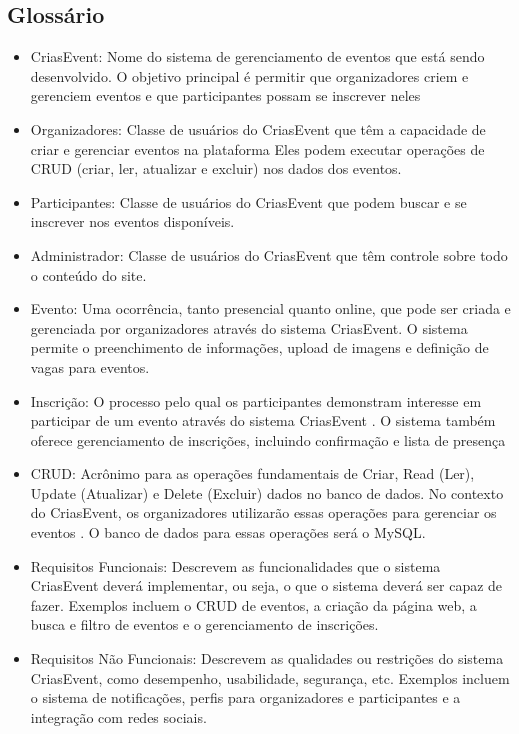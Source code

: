 \begin{appendices}
\chapter{Glossário}
\begin{itemize}
 \item CriasEvent: Nome do sistema de gerenciamento de eventos que está sendo desenvolvido. O objetivo principal é permitir que organizadores criem e gerenciem eventos e que participantes possam se inscrever neles

\item Organizadores: Classe de usuários do CriasEvent que têm a capacidade de criar e gerenciar eventos na plataforma Eles podem executar operações de CRUD (criar, ler, atualizar e excluir) nos dados dos eventos.

\item Participantes: Classe de usuários do CriasEvent que podem buscar e se inscrever nos eventos disponíveis.

\item Administrador: Classe de usuários do CriasEvent que têm controle sobre todo o conteúdo do site.

\item Evento: Uma ocorrência, tanto presencial quanto online, que pode ser criada e gerenciada por organizadores através do sistema CriasEvent. O sistema permite o preenchimento de informações, upload de imagens e definição de vagas para eventos.

\item Inscrição: O processo pelo qual os participantes demonstram interesse em participar de um evento através do sistema CriasEvent . O sistema também oferece gerenciamento de inscrições, incluindo confirmação e lista de presença 

\item CRUD: Acrônimo para as operações fundamentais de Criar, Read (Ler), Update (Atualizar) e Delete (Excluir) dados no banco de dados. No contexto do CriasEvent, os organizadores utilizarão essas operações para gerenciar os eventos . O banco de dados para essas operações será o MySQL.

\item Requisitos Funcionais: Descrevem as funcionalidades que o sistema CriasEvent deverá implementar, ou seja, o que o sistema deverá ser capaz de fazer. Exemplos incluem o CRUD de eventos, a criação da página web, a busca e filtro de eventos e o gerenciamento de inscrições.

\item Requisitos Não Funcionais: Descrevem as qualidades ou restrições do sistema CriasEvent, como desempenho, usabilidade, segurança, etc. Exemplos incluem o sistema de notificações, perfis para organizadores e participantes e a integração com redes sociais.
\end{itemize}
\end{appendices}


